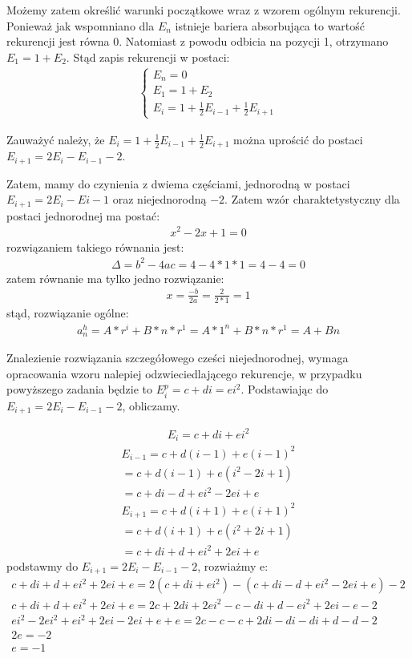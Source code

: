 \documentclass[12pt,oneside,a4paper]{book} %
\theoremstyle{break}
\begin{document}
Możemy zatem określić warunki początkowe wraz z wzorem ogólnym rekurencji. Ponieważ jak wspomniano dla $E_n$ istnieje bariera absorbująca to wartość rekurencji jest równa 0.
Natomiast z powodu odbicia na pozycji 1, otrzymano $E_1=1+E_2$. Stąd zapis rekurencji w postaci:
\begin{align*}
  \begin{cases}
    E_n=0\\
    E_1=1+E_2\\
    E_i=1+\frac{1}{2}E_{i-1}+\frac{1}{2}E_{i+1}
  \end{cases}
\end{align*}

Zauważyć należy, że $E_i=1+\frac{1}{2}E_{i-1}+\frac{1}{2}E_{i+1}$ można uprościć do postaci $E_{i+1}=2E_i-E_{i-1}-2$.

Zatem, mamy do czynienia z dwiema częściami, jednorodną w postaci $E_{i+1}=2E_i-E{i-1}$ oraz niejednorodną $-2$. Zatem wzór charaktetystyczny dla postaci jednorodnej ma postać: 
\begin{align*}
  x^2-2x+1=0
\end{align*}
rozwiązaniem takiego równania jest:
\begin{align*}
  \Delta=b^2-4ac=4-4*1*1=4-4=0
\end{align*}
zatem równanie ma tylko jedno rozwiązanie:
\begin{align*}
  x=\frac{-b}{2a}=\frac{2}{2*1}=1
\end{align*}
stąd, rozwiązanie ogólne:
\begin{align*}
  a_n^h=A*r^i+B*n*r^1=A*1^n+B*n*r^1=A+Bn
\end{align*}

Znalezienie rozwiązania szczegółowego cześci niejednorodnej, wymaga opracowania wzoru nalepiej odzwieciedlającego rekurencje, w przypadku powyższego zadania będzie to $E_i^p=c+di=ei^2$. Podstawiając do $E_{i+1}=2E_i-E_{i-1}-2$, obliczamy.

\begin{align*}
  E_i=c+di+ei^2
\end{align*}
\begin{align*}
  E_{i-1}=c+d(i-1)+e(i-1)^2\\=c+d(i-1)+e(i^2-2i+1)\\=c+di-d+ei^2-2ei+e
\end{align*}
\begin{align*}
  E_{i+1}=c+d(i+1)+e(i+1)^2\\=c+d(i+1)+e(i^2+2i+1)\\=c+di+d+ei^2+2ei+e
\end{align*}
podstawmy do $E_{i+1}=2E_i-E_{i-1}-2$, rozwiażmy e:
\begin{align*}
  c+di+d+ei^2+2ei+e=2(c+di+ei^2)-(c+di-d+ei^2-2ei+e)-2\\
  c+di+d+ei^2+2ei+e=2c+2di+2ei^2-c-di+d-ei^2+2ei-e-2\\
  ei^2-2ei^2+ei^2+2ei-2ei+e+e=2c-c-c+2di-di-di+d-d-2\\
  2e=-2\\
  e=-1
\end{align*}
\end{document}
